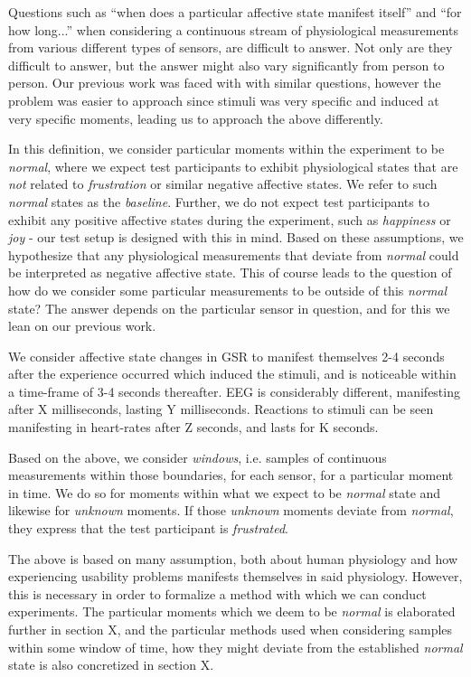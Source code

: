 Questions such as ``when does a particular affective state manifest itself'' and ``for how long...''  when considering a
continuous stream of physiological measurements from various different types of sensors, are difficult to answer. Not
only are they difficult to answer, but the answer might also vary significantly from person to person. Our previous work
was faced with with similar questions, however the problem was easier to approach since stimuli was very specific and
induced at very specific moments, leading us to approach the above differently.  

In this definition, we consider particular moments within the experiment to be \textit{normal}, where we expect test
participants to exhibit physiological states that are \textit{not} related to \textit{frustration} or similar negative
affective states. We refer to such \textit{normal} states as the \textit{baseline}. Further, we do not expect test
participants to exhibit any positive affective states during the experiment, such as \textit{happiness} or \textit{joy}
- our test setup is designed with this in mind. Based on these assumptions, we hypothesize that any physiological
measurements that deviate from \textit{normal} could be interpreted as negative affective state. This of course leads to
the question of how do we consider some particular measurements to be outside of this \textit{normal} state? The answer
depends on the particular sensor in question, and for this we lean on our previous work.

We consider affective state changes in GSR to manifest themselves 2-4 seconds after the experience occurred which
induced the stimuli, and is noticeable within a time-frame of 3-4 seconds thereafter. EEG is considerably different,
manifesting after X milliseconds, lasting Y milliseconds. Reactions to stimuli can be seen manifesting in heart-rates
after Z seconds, and lasts for K seconds. 

Based on the above, we consider \textit{windows}, i.e. samples of continuous measurements within those boundaries, for
each sensor, for a particular moment in time. We do so for moments within what we expect to be \textit{normal} state and
likewise for \textit{unknown} moments. If those \textit{unknown} moments deviate from \textit{normal}, they express that
the test participant is \textit{frustrated}.

The above is based on many assumption, both about human physiology and how experiencing usability problems manifests
themselves in said physiology. However, this is necessary in order to formalize a method with which we can conduct
experiments. The particular moments which we deem to be \textit{normal} is elaborated further in section X, and the
particular methods used when considering samples within some window of time, how they might deviate from the established
\textit{normal} state is also concretized in section X.

